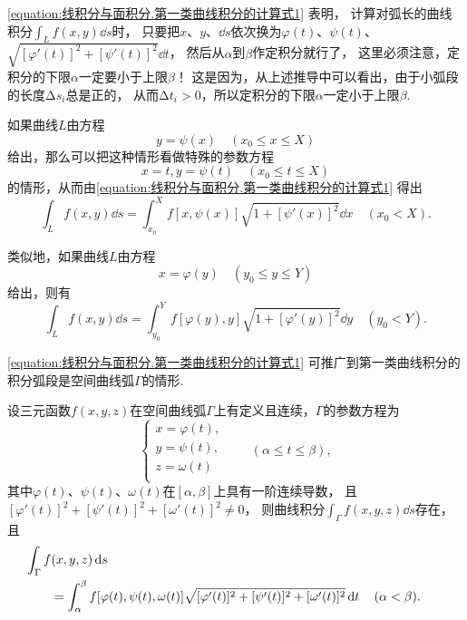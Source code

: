 \cref{equation:线积分与面积分.第一类曲线积分的计算式1} 表明，
计算对弧长的曲线积分\(\int_L f(x,y) \dd{s}\)时，
只要把\(x\)、\(y\)、\(\dd{s}\)依次换为\(\varphi(t)\)、\(\psi(t)\)、\(\sqrt{[\varphi'(t)]^2+[\psi'(t)]^2} \dd{t}\)，
然后从\(\alpha\)到\(\beta\)作定积分就行了，
这里必须注意，定积分的下限\(\alpha\)一定要小于上限\(\beta\)！
这是因为，从上述推导中可以看出，由于小弧段的长度\(\increment s_i\)总是正的，
从而\(\increment t_i > 0\)，所以定积分的下限\(\alpha\)一定小于上限\(\beta\).

如果曲线\(L\)由方程\[
y = \psi(x)
\quad(x_0 \leq x \leq X)
\]给出，那么可以把这种情形看做特殊的参数方程\[
x = t,
y = \psi(t)
\quad(x_0 \leq t \leq X)
\]的情形，从而由\cref{equation:线积分与面积分.第一类曲线积分的计算式1} 得出
\begin{equation}
\int_L f(x,y) \dd{s}
= \int_{x_0}^X f[x,\psi(x)] \sqrt{1+[\psi'(x)]^2} \dd{x}
\quad(x_0 < X).
\end{equation}

类似地，如果曲线\(L\)由方程\[
x = \varphi(y)
\quad(y_0 \leq y \leq Y)
\]给出，则有
\begin{equation}
\int_L f(x,y) \dd{s}
= \int_{y_0}^Y f[\varphi(y),y] \sqrt{1+[\varphi'(y)]^2} \dd{y}
\quad(y_0 < Y).
\end{equation}

\cref{equation:线积分与面积分.第一类曲线积分的计算式1} 可推广到第一类曲线积分的积分弧段是空间曲线弧\(\Gamma\)的情形.
\begin{theorem}
设三元函数\(f(x,y,z)\)在空间曲线弧\(\Gamma\)上有定义且连续，\(\Gamma\)的参数方程为\[
\left\{ \begin{array}{l}
x = \varphi(t), \\
y = \psi(t), \\
z = \omega(t) \\
\end{array} \right.
\qquad
(\alpha \leq t \leq \beta),
\]其中\(\varphi(t)\)、\(\psi(t)\)、\(\omega(t)\)在\([\alpha,\beta]\)上具有一阶连续导数，
且\([\varphi'(t)]^2+[\psi'(t)]^2+[\omega'(t)]^2 \neq 0\)，
则曲线积分\(\int_{\Gamma} f(x,y,z) \dd{s}\)存在，
且\begin{equation}\label{equation:线积分与面积分.第一类曲线积分的计算式2}
\begin{aligned}
&\hspace{-20pt}
\int_{\Gamma} f(x,y,z) \dd{s} \\
&= \int_{\alpha}^{\beta} f[\varphi(t),\psi(t),\omega(t)] \sqrt{[\varphi'(t)]^2+[\psi'(t)]^2+[\omega'(t)]^2} \dd{t}
\quad(\alpha<\beta).
\end{aligned}
\end{equation}
\end{theorem}

